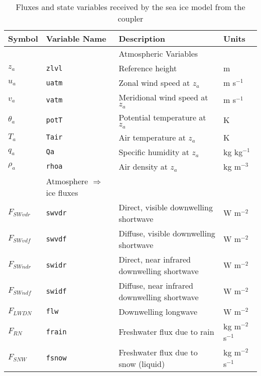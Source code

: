 \begin{table}
  \begin{center}
  \caption{Fluxes and state variables received by the sea ice model from the coupler}
  \label{table:flux_to_seaice}
  \begin{tabular}{llll} \hline
         Symbol   & Variable Name      & Description                     & Units     \\ \hline \hline
                     &              & Atmospheric Variables              &  \\  \hline
         $z_a$       & {\tt zlvl}   &  Reference height                  &  m    \\
         $u_a$       & {\tt uatm}   &  Zonal wind speed at $z_a$         &  m s$^{-1}$    \\
         $v_a$       & {\tt vatm}   &  Meridional wind speed at $z_a$    &  m s$^{-1}$    \\
         $\theta_a$  & {\tt potT}   &  Potential temperature at $z_a$    &  K             \\
         $T_a$       & {\tt Tair}   &  Air temperature at $z_a$          &  K             \\
         $q_a$       & {\tt Qa}     &  Specific humidity at $z_a$        &  kg kg$^{-1}$  \\
         $\rho_a$    & {\tt rhoa}   &  Air density at $z_a$              &  kg m$^{-3}$   \\   \hline
                        & Atmosphere $\Rightarrow$ ice fluxes            &  \\  \hline
         $F_{SWvdr}$ & {\tt swvdr}  &  Direct, visible downwelling shortwave         &  W m$^{-2}$  \\
         $F_{SWvdf}$ & {\tt swvdf}  &  Diffuse, visible downwelling shortwave        &  W m$^{-2}$  \\
         $F_{SWndr}$ & {\tt swidr}  &  Direct, near infrared downwelling shortwave   &  W m$^{-2}$  \\
         $F_{SWndf}$ & {\tt swidf}  &  Diffuse, near infrared downwelling shortwave  &  W m$^{-2}$  \\
         $F_{LWDN}$  & {\tt flw}    &  Downwelling longwave                          &  W m$^{-2}$  \\
         $F_{RN}$    & {\tt frain}  &  Freshwater flux due to rain                   &  kg m$^{-2}$ s$^{-1}$  \\
         $F_{SNW}$   & {\tt fsnow}  &  Freshwater flux due to snow (liquid)          &  kg m$^{-2}$ s$^{-1}$  \\ \hline

\end{tabular}
\end{center}
\end{table}
